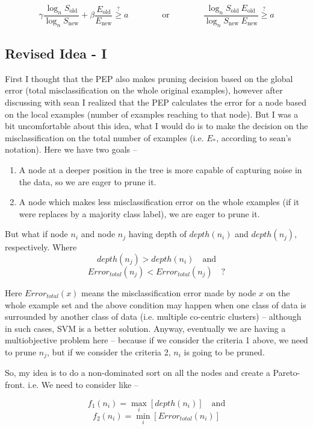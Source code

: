\documentclass{article}
\begin{document}
\[
\gamma \frac{\log_n S_\text{old}}{\log_n S_\text{new}} + \beta \frac{E_\text{old}}{E_\text{new}} \stackrel{?}{\geq} a
\qquad\qquad\text{or}\qquad\qquad \frac{\log_n S_\text{old}\ E_\text{old}}{\log_n S_\text{new}\ E_\text{new}} \stackrel{?}{\geq} a
\]

\subsection{Revised Idea - I}
First I thought that the PEP also makes pruning decision based on the global error (total misclassification on the whole original examples), however after discussing with sean I realized that the PEP calculates the error for a node based on the local examples (number of examples reaching to that node). But I was a bit uncomfortable about this idea, what I would do is to make the decision on the misclassification on the total number of examples (i.e. \(E_{*}\), according to sean's notation). Here we have two goals -- 
\begin{enumerate}
	\item A node at a deeper position in the tree is more capable of capturing noise in the data, so we are eager to prune it.
	\item A node which makes less misclassification error on the whole examples (if it were replaces by a majority class label), we are eager to prune it.
\end{enumerate}

But what if node \(n_i\) and node \(n_j\) having depth of \(depth(n_i)\) and \(depth(n_j)\), respectively. Where 
	\[
		depth(n_j) > depth(n_i) \quad \text{and}
	\] 
	\[
		Error_{total}(n_j) < Error_{total}(n_j) \quad \text{?}
	\] 

Here \(Error_{total}(x)\) means the misclassification error made by node \(x\) on the whole example set and the above condition may happen when one class of data is surrounded by another class of data (i.e. multiple co-centric clusters) -- although in such cases, SVM is a better solution. Anyway, eventually we are having a multiobjective problem here -- because if we consider the criteria 1 above, we need to prune \(n_j\), but if we consider the criteria 2, \(n_i\) is going to be pruned. 

So, my idea is to do a non-dominated sort on all the nodes and create a Pareto-front. i.e. We need to consider like -- 

	\[
		f_1(n_i) = \max\limits_i [depth(n_i)] \quad \text{and}
	\] 
	\[
		f_2(n_i) = \min\limits_i [Error_{total}(n_i)]
	\] 
\end{document}
